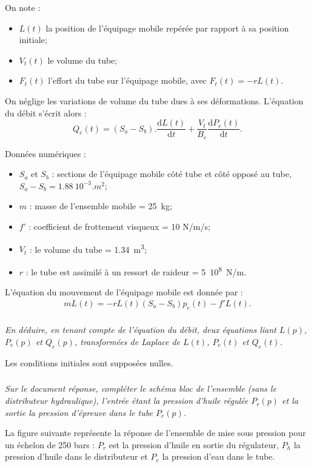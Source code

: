 \documentclass[10pt,fleqn]{article} %
\begin{document}
\begin{multicols}{2}
On note :
\begin{itemize}
	\item $L(t)$ la position de l’équipage mobile repérée par rapport à sa position initiale;
	\item $V_t(t)$ le volume du tube;
	\item $F_t(t)$ l’effort du tube sur l’équipage mobile, avec $F_t(t) = - rL(t)$.
\end{itemize}

On néglige les variations de volume du tube dues à ses déformations. L’équation du débit s’écrit alors :
	$$Q_e (t)=(S_a-S_b ).\dfrac{\text{d}L(t)}{\text{d}t}+\dfrac{V_t}{B_e}  \dfrac{\text{d}P_e (t)}{\text{d}t}.$$
	
	
Données numériques :
\begin{itemize}
	\item $S_a$ et $S_b$ :	sections de l’équipage mobile côté tube et côté opposé au tube,
$S_a -S_b  = \SI{1,88}{10^{-3}.m^2}$;	
	\item $m$ :		masse de l’ensemble mobile = \SI{25}{kg};
	\item $f ’$ :		coefficient de frottement visqueux = 10 N/m/s;
	\item $V_t$ :		le volume du tube = \SI{1,34}{m^3};
	\item $r$ :		le tube est assimilé à un ressort de raideur = \SI{5}{10^8.N/m}.
\end{itemize}


L’équation du mouvement de l’équipage mobile est donnée par : 
$$
m\ddot{L}(t)=-rL(t)\left(S_a-S_b \right)p_e(t)-f'L(t).
$$

\subparagraph{}
\textit{En déduire, en tenant compte de l’équation du débit, deux équations liant $L(p)$, $P_e(p)$ et $Q_e(p)$, transformées de Laplace de $L(t)$, $P_e(t)$ et $Q_e(t)$. }

Les conditions initiales sont supposées nulles.

\subparagraph{}
\textit{Sur le document réponse, compléter le schéma bloc de l’ensemble (sans le distributeur hydraulique), l’entrée étant la pression d’huile régulée $P_r(p)$ et la sortie la pression d’épreuve dans le tube $P_e(p)$.}



La figure suivante représente la réponse de l’ensemble de mise sous pression pour un échelon de 250 bars : $P_r$ est la pression d’huile en sortie du régulateur, $P_h$ la pression d’huile dans le distributeur et $P_e$ la pression d’eau dans le tube.


\end{multicols}
\end{document}
